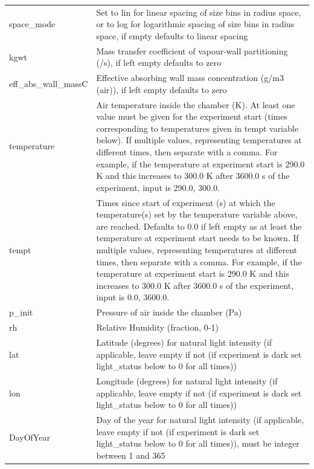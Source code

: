 \documentclass[gmd, manuscript]{copernicus}
\begin{document}
\begin{center}
\begin{supertabular}{p{0.15\textwidth}p{0.75\textwidth}}
space\_mode & Set to lin for linear spacing of size bins in radius space, or to log for logarithmic spacing of size bins in radius space, if empty defaults to linear spacing\\

kgwt & Mass transfer coefficient of vapour-wall partitioning (/s), if left empty defaults to zero\\

eff\_abs\_wall\_massC & Effective absorbing wall mass concentration (g/m3 (air)), if left empty defaults to zero\\

temperature & Air temperature inside the chamber (K).  At least one value must be given for the experiment start (times corresponding to temperatures given in tempt variable below).  If multiple values, representing temperatures at different times, then separate with a comma.  For example, if the temperature at experiment start is 290.0 K and this increases to 300.0 K after 3600.0 s of the experiment, input is 290.0, 300.0.\\

tempt & Times since start of experiment (s) at which the temperature(s) set by the temperature variable above, are reached.  Defaults to 0.0 if left empty as at least the temperature at experiment start needs to be known.  If multiple values, representing temperatures at different times, then separate with a comma.  For example, if the temperature at experiment start is 290.0 K and this increases to 300.0 K after 3600.0 s of the experiment, input is 0.0, 3600.0.\\

p\_init &  Pressure of air inside the chamber (Pa)\\

rh & Relative Humidity (fraction, 0-1)\\

lat & Latitude (degrees) for natural light intensity (if applicable, leave empty if not (if experiment is dark set light\_status below to 0 for all times))\\
lon & Longitude (degrees) for natural light intensity (if applicable, leave empty if not (if experiment is dark set light\_status below to 0 for all times))\\	

DayOfYear & Day of the year for natural light intensity (if applicable, leave empty if not (if experiment is dark set light\_status below to 0 for all times)), must be integer between 1 and 365\\


\end{supertabular}
\end{center}
\end{document}
